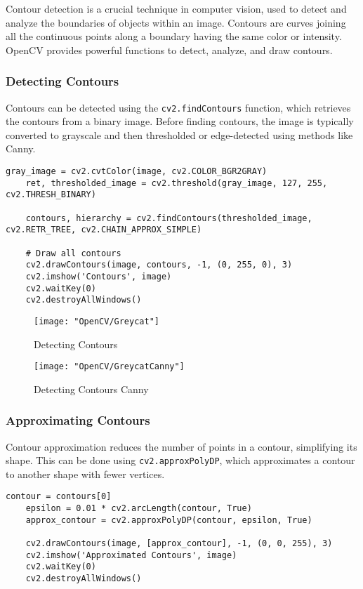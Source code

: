 Contour detection is a crucial technique in computer vision, used to detect and analyze the boundaries of objects within an image. Contours are curves joining all the continuous points along a boundary having the same color or intensity. OpenCV provides powerful functions to detect, analyze, and draw contours.

\subsubsection{Detecting Contours}
Contours can be detected using the \texttt{cv2.findContours} function, which retrieves the contours from a binary image. Before finding contours, the image is typically converted to grayscale and then thresholded or edge-detected using methods like Canny.

\begin{lstlisting}[caption=Detecting Contours]
	gray_image = cv2.cvtColor(image, cv2.COLOR_BGR2GRAY)
	ret, thresholded_image = cv2.threshold(gray_image, 127, 255, cv2.THRESH_BINARY)
	
	contours, hierarchy = cv2.findContours(thresholded_image, cv2.RETR_TREE, cv2.CHAIN_APPROX_SIMPLE)
	
	# Draw all contours
	cv2.drawContours(image, contours, -1, (0, 255, 0), 3)
	cv2.imshow('Contours', image)
	cv2.waitKey(0)
	cv2.destroyAllWindows()
\end{lstlisting}

\begin{figure}[h]
	\centering
	\texttt{[image: "OpenCV/Greycat"]}
	\caption{Detecting Contours}\label{Detecting Contours}
\end{figure}
\begin{figure}[h]
	\centering
	\texttt{[image: "OpenCV/GreycatCanny"]}
	\caption{Detecting Contours Canny}\label{Detecting Contours Canny}
\end{figure}

\subsubsection{Approximating Contours}
Contour approximation reduces the number of points in a contour, simplifying its shape. This can be done using \texttt{cv2.approxPolyDP}, which approximates a contour to another shape with fewer vertices.\cite{OpenCVTeam:2024}

\begin{lstlisting}[caption=Approximating Contours]
	contour = contours[0]
	epsilon = 0.01 * cv2.arcLength(contour, True)
	approx_contour = cv2.approxPolyDP(contour, epsilon, True)
	
	cv2.drawContours(image, [approx_contour], -1, (0, 0, 255), 3)
	cv2.imshow('Approximated Contours', image)
	cv2.waitKey(0)
	cv2.destroyAllWindows()
\end{lstlisting}

